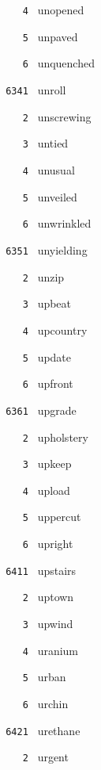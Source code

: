 \documentclass[11pt]{article}
\begin{document}
\begin{multicols}{6}
\noindent \texttt{ \ \ \ 4 } unopened  \par
\noindent \texttt{ \ \ \ 5 } unpaved  \par
\noindent \texttt{ \ \ \ 6 } unquenched  \par
\vspace{3mm}
\noindent \texttt{ 6341 } unroll  \par
\noindent \texttt{ \ \ \ 2 } unscrewing  \par
\noindent \texttt{ \ \ \ 3 } untied  \par
\noindent \texttt{ \ \ \ 4 } unusual  \par
\noindent \texttt{ \ \ \ 5 } unveiled  \par
\noindent \texttt{ \ \ \ 6 } unwrinkled  \par
\vspace{3mm}
\noindent \texttt{ 6351 } unyielding  \par
\noindent \texttt{ \ \ \ 2 } unzip  \par
\noindent \texttt{ \ \ \ 3 } upbeat  \par
\noindent \texttt{ \ \ \ 4 } upcountry  \par
\noindent \texttt{ \ \ \ 5 } update  \par
\noindent \texttt{ \ \ \ 6 } upfront  \par
\vspace{3mm}
\noindent \texttt{ 6361 } upgrade  \par
\noindent \texttt{ \ \ \ 2 } upholstery  \par
\noindent \texttt{ \ \ \ 3 } upkeep  \par
\noindent \texttt{ \ \ \ 4 } upload  \par
\noindent \texttt{ \ \ \ 5 } uppercut  \par
\noindent \texttt{ \ \ \ 6 } upright  \par
\noindent \texttt{ 6411 } upstairs  \par
\noindent \texttt{ \ \ \ 2 } uptown  \par
\noindent \texttt{ \ \ \ 3 } upwind  \par
\noindent \texttt{ \ \ \ 4 } uranium  \par
\noindent \texttt{ \ \ \ 5 } urban  \par
\noindent \texttt{ \ \ \ 6 } urchin  \par
\vspace{3mm}
\noindent \texttt{ 6421 } urethane  \par
\noindent \texttt{ \ \ \ 2 } urgent  \par

\end{multicols}
\end{document}
